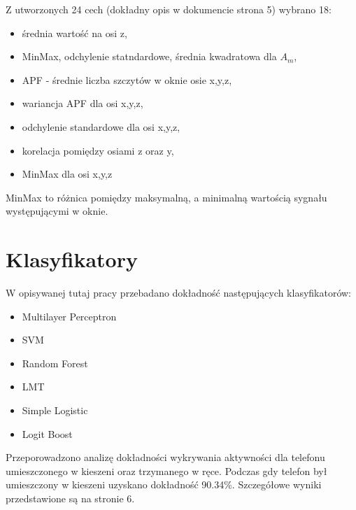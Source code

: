 \documentclass{article}
\begin{document}
Z utworzonych 24 cech (dokładny opis w dokumencie strona 5) wybrano 18:
\begin{itemize}
	\item średnia wartość na osi z,
	\item MinMax, odchylenie statndardowe, średnia kwadratowa dla $A_m$,
	\item APF - średnie liczba szczytów w oknie osie x,y,z,
	\item wariancja APF dla osi x,y,z,
	\item odchylenie standardowe dla osi x,y,z,
	\item korelacja pomiędzy osiami z oraz y,
	\item MinMax dla osi x,y,z
\end{itemize}

MinMax to różnica pomiędzy maksymalną, a minimalną wartością sygnału występującymi w oknie.

\section{Klasyfikatory}
W opisywanej tutaj pracy przebadano dokładność następujących klasyfikatorów:
\begin{itemize}
	\item Multilayer Perceptron
	\item SVM
	\item Random Forest
	\item LMT
	\item Simple Logistic
	\item Logit Boost
\end{itemize}

Przeporowadzono analizę dokładności wykrywania aktywności dla telefonu umieszczonego w kieszeni oraz trzymanego w ręce. Podczas gdy telefon był umieszczony w kieszeni uzyskano dokładność 90.34\%. Szczegółowe wyniki przedstawione są na stronie 6.
\end{document}
